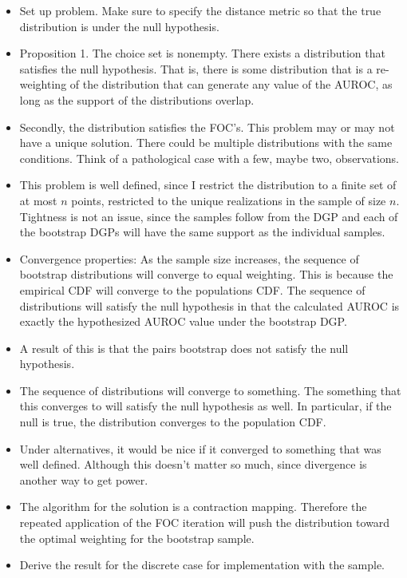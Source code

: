 \begin{itemize}

  \item Set up problem. Make sure to specify the distance metric so that the true distribution is under the null hypothesis. 
  
  \item Proposition 1. The choice set is nonempty. There exists a distribution that satisfies the null hypothesis. That is, there is some distribution that is a re-weighting of the distribution that can generate any value of the AUROC, as long as the support of the distributions overlap. 
  
  \item Secondly, the distribution satisfies the FOC's. This problem may or may not have a unique solution. There could be multiple distributions with the same conditions. Think of a pathological case with a few, maybe two, observations. 
      
  \item This problem is well defined, since I restrict the distribution to a finite set of at most $n$ points, restricted to the unique realizations in the sample of size $n$. Tightness is not an issue, since the samples follow from the DGP and each of the bootstrap DGPs will have the same support as the individual samples. 
      
  \item Convergence properties: As the sample size increases, the sequence of bootstrap distributions will converge to equal weighting. This is because the empirical CDF will converge to the populations CDF. The sequence of distributions will satisfy the null hypothesis in that the calculated AUROC is exactly the hypothesized AUROC value under the bootstrap DGP. 
      
  \item A result of this is that the pairs bootstrap does not satisfy the null hypothesis. 
  
  \item The sequence of distributions will converge to something. 
  The something that this converges to will satisfy the null hypothesis as well. 
  In particular, if the null is true, the distribution converges to the population CDF. 
  
  \item Under alternatives, it would be nice if it converged to something that was well defined. 
  Although this doesn't matter so much, since divergence is another way to get power. 
  
  \item The algorithm for the solution is a contraction mapping. 
  Therefore the repeated application of the FOC iteration will push the distribution toward the optimal weighting for the bootstrap sample. 
  
  \item Derive the result for the discrete case for implementation with the sample. 

\end{itemize}


